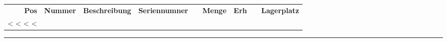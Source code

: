 \documentclass[twoside]{scrartcl}
\begin{document}
\vspace{1cm}

\begin{tabularx}{\textwidth}{@{}rlXllrrll@{}}
  \textbf{Pos} & \textbf{Nummer} & \textbf{Beschreibung} & \textbf{Seriennumner} & & \textbf{Menge} & \textbf{Erh} & & \textbf{Lagerplatz} \\

<%
  <%
  <%
<%
\end{tabularx}


\rule{\textwidth}{2pt}
\end{document}
